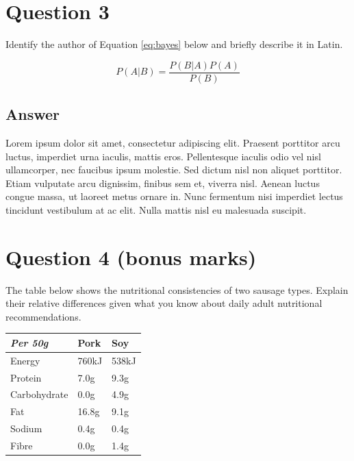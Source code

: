 \documentclass[12pt]{fphw}
\begin{document}

\section*{Question 3}

\begin{problem}
	Identify the author of Equation \ref{eq:bayes} below and briefly describe it in Latin.
	
	\medskip
	
	\begin{equation}\label{eq:bayes}
		P(A|B) = \frac{P(B|A)P(A)}{P(B)}
	\end{equation}
	
	\smallskip
\end{problem}


\subsection*{Answer} 

Lorem ipsum dolor sit amet, consectetur adipiscing elit. Praesent porttitor arcu luctus, imperdiet urna iaculis, mattis eros. Pellentesque iaculis odio vel nisl ullamcorper, nec faucibus ipsum molestie. Sed dictum nisl non aliquet porttitor. Etiam vulputate arcu dignissim, finibus sem et, viverra nisl. Aenean luctus congue massa, ut laoreet metus ornare in. Nunc fermentum nisi imperdiet lectus tincidunt vestibulum at ac elit. Nulla mattis nisl eu malesuada suscipit.


\section*{Question 4 (bonus marks)}

\begin{problem}
	The table below shows the nutritional consistencies of two sausage types. Explain their relative differences given what you know about daily adult nutritional recommendations.
	
	\bigskip
    
	\begin{center}
		\begin{tabular}{l l l}
			\toprule
			\textit{Per 50g} & Pork & Soy \\
			\midrule
			Energy & 760kJ & 538kJ\\
			Protein & 7.0g & 9.3g\\
			Carbohydrate & 0.0g & 4.9g\\
			Fat & 16.8g & 9.1g\\
			Sodium & 0.4g & 0.4g\\
			Fibre & 0.0g & 1.4g\\
			\bottomrule
		\end{tabular}
	\end{center}
	
	\medskip
\end{problem}
\end{document}
